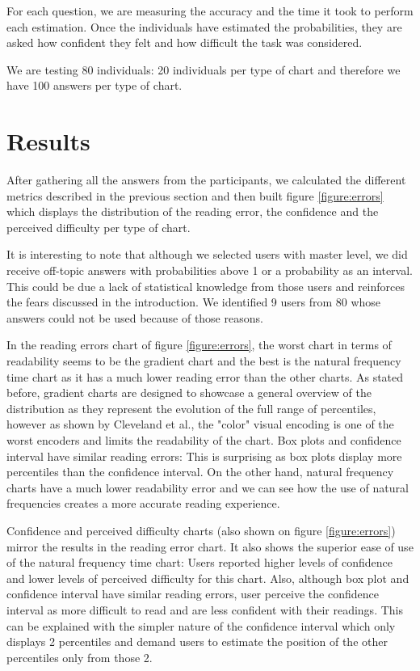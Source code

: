 \documentclass[a4paper,3p,sort&compress]{elsarticle}
\begin{document}
For each question, we are measuring the accuracy and the time it took to 
perform each estimation. Once the individuals have estimated the probabilities, they are asked how confident they 
felt and how difficult the task was considered.

We are testing 80 individuals: 20 individuals per type of chart and therefore we have 100 answers per 
type of chart.

\section{Results}
\label{sec:results}


After gathering all the answers from the participants, we calculated the different metrics described in the previous section and 
then built figure \ref{figure:errors} 
which displays 
the distribution of the reading error, the confidence and the perceived difficulty per type of chart. 

It is interesting to note that although we selected users with master level, we did receive off-topic answers with probabilities 
above 1 or a probability as an interval. This could be due a lack of statistical knowledge from those 
users and reinforces the fears discussed in the introduction. We identified 9 users from 80 whose answers could not be used because of those reasons.

In the reading errors chart of figure \ref{figure:errors}, the worst chart in terms of readability seems to be the 
gradient chart and the best is the natural frequency time chart as it has a much lower reading error than the other charts. As stated before, 
gradient charts are designed to showcase a general overview of the distribution as they represent the evolution of the
full range of percentiles, however as shown by Cleveland et al., the "color" visual encoding is one of the 
worst encoders and limits the readability of the chart. Box plots and confidence interval have similar reading errors: This is surprising
as box plots display more percentiles than the confidence interval. On the other hand, natural 
frequency charts have a much lower readability error and we can see how the use of natural frequencies creates a more accurate reading experience.

Confidence and perceived difficulty charts (also shown on figure \ref{figure:errors}) mirror the results in the reading error chart.
It also shows the superior ease of use 
of the natural frequency time chart: Users reported higher levels of confidence and 
lower levels of perceived difficulty for this chart. Also, although box plot and confidence interval have similar reading errors,
user perceive the confidence interval as more difficult to read and are less confident with their readings. This can be explained with 
the simpler nature of the confidence interval which only displays 2 percentiles and demand users to estimate the position of the other 
percentiles only from those 2.
\end{document}
